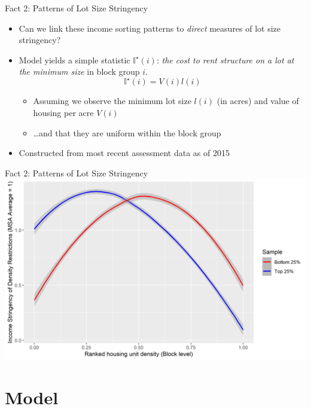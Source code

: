 \documentclass{beamer}
\begin{document}
\begin{frame}{Fact 2: Patterns of Lot Size Stringency}
	\begin{itemize}
		\color{black}
		\itemsep1em
		\item Can we link these income sorting patterns to \textit{direct} measures of lot size stringency?
		\pause
		\item Model yields a simple statistic $\mathbb{I}^{\star}(i)$: \textit{the cost to rent structure on a lot at the minimum size} in block group $i$.
		\begin{equation}
			\mathbb{I}^{\star}(i) = V(i)l(i)
		\end{equation}
		\begin{itemize}
			\itemsep1em
			\color{black}
			\item Assuming we \color{red} observe \color{black} the minimum lot size $l(i)$ (in acres) and value of housing per acre $V(i)$ 
			\item \dots and that they are uniform within the block group 
		\end{itemize}
	\pause
	\item Constructed from most recent assessment data as of 2015
	\end{itemize}
\end{frame}

\begin{frame}{Fact 2: Patterns of Lot Size Stringency}
		\includegraphics[width= \textwidth]{stringencyofDensityRestrictions.png}
\end{frame}

\section{Model}
\end{document}
